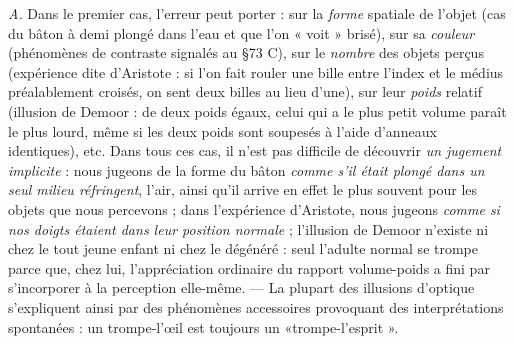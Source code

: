 {\it A.} Dans le premier cas, l’erreur peut porter : sur la {\it forme} spatiale
de l’objet (cas du bâton à demi plongé dans l’eau et que l’on « voit »
brisé), sur sa {\it couleur} (phénomènes de contraste signalés au \S 73 C),
sur le {\it nombre} des objets perçus (expérience dite d’Aristote : si l’on
fait rouler une bille entre l'index et le médius préalablement croisés,
on sent deux billes au lieu d’une), sur leur {\it poids} relatif (illusion de
Demoor : de deux poids égaux, celui qui a le plus petit volume paraît
le plus lourd, même si les deux poids sont soupesés à l’aide d’anneaux
identiques), etc. Dans tous ces cas, il n’est pas difficile de découvrir
{\it un jugement implicite} : nous jugeons de la forme du bâton {\it comme
s’il était plongé dans un seul milieu réfringent}, l'air, ainsi qu’il arrive
en effet le plus souvent pour les objets que nous percevons ; dans
l'expérience d’Aristote, nous jugeons {\it comme si nos doigts étaient
dans leur position normale} ; l'illusion de Demoor n’existe ni chez le
tout jeune enfant ni chez le dégénéré : seul l’adulte normal se trompe
parce que, chez lui, l’appréciation ordinaire du rapport volume-poids
a fini par s’incorporer à la perception elle-même. — La plupart des
illusions d’optique s’expliquent ainsi par des phénomènes accessoires
provoquant des interprétations spontanées : un trompe-l’œil est toujours
un «trompe-l’esprit ».

